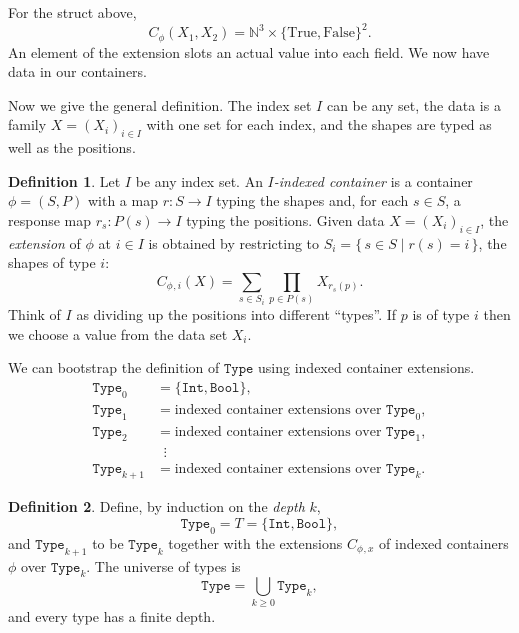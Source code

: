 \documentclass[11pt, a4paper]{article}
\theoremstyle{definition}
\newtheorem{definition}{Definition}[section]
\theoremstyle{plain}
\begin{document}
\medskip

For the struct above,
\[
  C_\phi(X_1, X_2)
  = \mathbb{N}^3 \times \{\mathrm{True}, \mathrm{False}\}^2.
\]
An element of the extension slots an actual value into each field.
We now have data in our containers.

\medskip

Now we give the general definition.  The index set $I$ can be any
set, the data is a family $X = (X_i)_{i \in I}$ with one set for
each index, and the shapes are typed as well as the positions.

\noindent\colorbox{gray!15}{\parbox{\dimexpr\linewidth-2\fboxsep}{%
\begin{definition}
Let $I$ be any index set.  An \emph{$I$-indexed container} is a
container $\phi = (S, P)$ with a map $r : S \to I$ typing the
shapes and, for each $s \in S$, a response map $r_s : P(s) \to I$
typing the positions.  Given data $X = (X_i)_{i \in I}$, the
\emph{extension} of $\phi$ at $i \in I$ is obtained by restricting
to $S_i = \{\, s \in S \mid r(s) = i \,\}$, the shapes of type $i$:
\[
  C_\phi{}_{,i}(X)
  = \sum_{s \in S_i} \prod_{p \in P(s)} X_{r_s(p)}.
\]
Think of $I$ as dividing up the positions into different ``types''.
If $p$ is of type $i$ then we choose a value from the data set
$X_i$.
\end{definition}%
}}

\medskip

We can bootstrap the definition of $\texttt{Type}$ using indexed
container extensions.
\begin{align*}
  \texttt{Type}_0 &= \{\texttt{Int}, \texttt{Bool}\},\\
  \texttt{Type}_1 &= \text{indexed container extensions over } \texttt{Type}_0,\\
  \texttt{Type}_2 &= \text{indexed container extensions over } \texttt{Type}_1,\\
  &\;\;\vdots\\
  \texttt{Type}_{k+1} &= \text{indexed container extensions over } \texttt{Type}_k.
\end{align*}

\medskip

\noindent\colorbox{gray!15}{\parbox{\dimexpr\linewidth-2\fboxsep}{%
\begin{definition}\label{def:type-universe}
Define, by induction on the \emph{depth} $k$,
\[
  \texttt{Type}_0 = T = \{\texttt{Int}, \texttt{Bool}\},
\]
and $\texttt{Type}_{k+1}$ to be $\texttt{Type}_k$ together with the
extensions $C_\phi{}_{,x}$ of indexed containers $\phi$ over
$\texttt{Type}_k$.  The universe of types is
\[
  \texttt{Type} = \bigcup_{k \geq 0} \texttt{Type}_k,
\]
and every type has a finite depth.
\end{definition}%
}}
\end{document}
